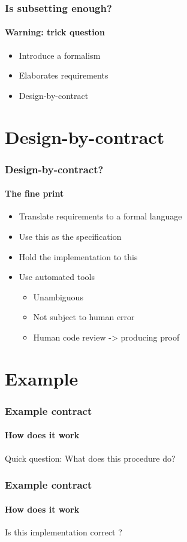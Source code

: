 \documentclass[presentation]{beamer}   %
\begin{document}
\begin{frame}
  \frametitle{Is subsetting enough?}
  \framesubtitle{Warning: trick question}
      \begin{itemize}
        \item Introduce a formalism
        \item Elaborates requirements 
        \item Design-by-contract
      \end{itemize}
\end{frame}

\section{Design-by-contract}
\begin{frame}
  \frametitle{Design-by-contract?}
  \framesubtitle{The fine print}
  \begin{itemize}
    \item Translate requirements to a formal language
    \item Use this as the specification
    \item Hold the implementation to this
	\item Use automated tools
      \begin{itemize}
        \item Unambiguous
        \item Not subject to human error
        \item Human code review -> producing proof
      \end{itemize}
  \end{itemize}
\end{frame}

\section{Example}
\begin{frame}
  \frametitle{Example contract}
  \framesubtitle{How does it work}
 
  \begin{block}{Quick question: What does this procedure do?}
 
 \end{block}
\end{frame}
\begin{frame}
  \frametitle{Example contract}
  \framesubtitle{How does it work}
  \begin{block}{Is this implementation correct ?}
 
 \end{block}
\end{frame}
\end{document}
